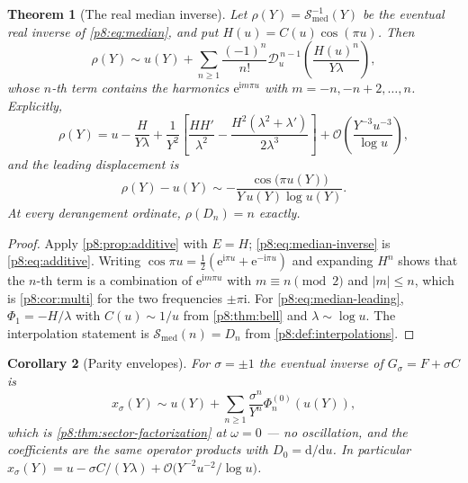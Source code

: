 \documentclass[11pt,a4paper,oneside]{book}
\theoremstyle{plain}
\newtheorem{theorem}{Theorem}[chapter]
\newtheorem{corollary}[theorem]{Corollary}
\theoremstyle{definition}
\theoremstyle{remark}
\newcommand{\e}{\mathrm{e}}
\newcommand{\ii}{\mathrm{i}}
\newcommand{\dd}{\mathrm{d}}
\newcommand{\bigO}{\mathcal{O}}
\begin{document}
\begin{theorem}[The real median inverse]\label{p8:thm:median-inverse}
Let $\rho(Y)=\mathcal{S}_{\mathrm{med}}^{-1}(Y)$ be the eventual real inverse
of \eqref{p8:eq:median}, and put $H(u)=C(u)\cos(\pi u)$.  Then
\begin{equation}\label{p8:eq:median-inverse}
 \rho(Y)\sim u(Y)+\sum_{n\ge1}\frac{(-1)^{n}}{n!}
 \mathscr{D}_u^{\,n-1}\!\left(\frac{H(u)^{n}}{Y\lambda}\right),
\end{equation}
whose $n$-th term contains the harmonics $\e^{\ii m\pi u}$ with
$m=-n,-n+2,\dots,n$.  Explicitly,
\begin{equation}\label{p8:eq:median-two-sectors}
 \rho(Y)=u-\frac H{Y\lambda}
 +\frac1{Y^{2}}\left[\frac{HH'}{\lambda^{2}}
 -\frac{H^{2}(\lambda^{2}+\lambda')}{2\lambda^{3}}\right]
 +\bigO\!\left(\frac{Y^{-3}u^{-3}}{\log u}\right),
\end{equation}
and the leading displacement is
\begin{equation}\label{p8:eq:median-leading}
 \rho(Y)-u(Y)\sim-\frac{\cos\bigl(\pi u(Y)\bigr)}{Y\,u(Y)\log u(Y)} .
\end{equation}
At every derangement ordinate, $\rho(D_n)=n$ exactly.
\end{theorem}

\begin{proof}
Apply \cref{p8:prop:additive} with $E=H$; \eqref{p8:eq:median-inverse} is
\eqref{p8:eq:additive}.  Writing $\cos\pi u=\tfrac12(\e^{\ii\pi u}
+\e^{-\ii\pi u})$ and expanding $H^{n}$ shows that the $n$-th term is a
combination of $\e^{\ii m\pi u}$ with $m\equiv n\pmod2$ and $|m|\le n$, which
is \cref{p8:cor:multi} for the two frequencies $\pm\pi\ii$.  For
\eqref{p8:eq:median-leading}, $\Phi_1=-H/\lambda$ with $C(u)\sim1/u$ from
\cref{p8:thm:bell} and $\lambda\sim\log u$.  The interpolation statement is
$\mathcal{S}_{\mathrm{med}}(n)=D_n$ from
\cref{p8:def:interpolations}.
\end{proof}

\begin{corollary}[Parity envelopes]\label{p8:cor:parity}
For $\sigma=\pm1$ the eventual inverse of $G_\sigma=F+\sigma C$ is
\begin{equation}\label{p8:eq:parity-inverse}
 x_\sigma(Y)\sim u(Y)+\sum_{n\ge1}\frac{\sigma^{n}}{Y^{n}}
 \Phi_n^{(0)}(u(Y)),
\end{equation}
which is \cref{p8:thm:sector-factorization} at $\omega=0$ --- no oscillation,
and the coefficients are the same operator products with $D_0=\dd/\dd u$.  In
particular
$x_\sigma(Y)=u-\sigma C/(Y\lambda)+\bigO\bigl(Y^{-2}u^{-2}/\log u\bigr)$.
\end{corollary}
\end{document}
